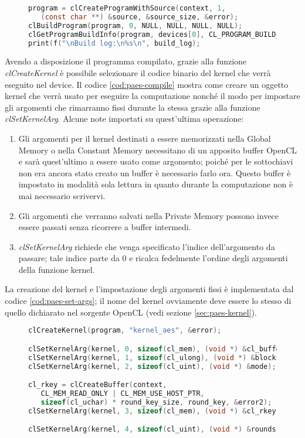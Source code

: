 \documentclass[12pt,a4paper,oneside]{book}
\begin{document}
\begin{figure}
\begin{lstlisting}[caption={\textit{Compilazione del programma da eseguire sul dispositivo.}},label={cod:paes-compile},language=C]
program = clCreateProgramWithSource(context, 1,
   (const char **) &source, &source_size, &error);
clBuildProgram(program, 0, NULL, NULL, NULL, NULL);
clGetProgramBuildInfo(program, devices[0], CL_PROGRAM_BUILD_LOG, 300, build_log, NULL);
print(f("\nBuild log:\n%s\n", build_log);
\end{lstlisting}
\end{figure}

Avendo a disposizione il programma compilato, grazie alla funzione \textit{clCreateKernel} è possibile selezionare il codice binario del kernel che verrà eseguito nel device. Il codice \ref{cod:paes-compile} mostra come creare un oggetto kernel che verrà usato per eseguire la computazione nonché il modo per impostare gli argomenti che rimarranno fissi durante la stessa grazie alla funzione \textit{clSetKernelArg}. Alcune note importati su quest'ultima operazione:
\begin{enumerate}
\item Gli argomenti per il kernel destinati a essere memorizzati nella Global Memory o nella Constant Memory necessitano di un apposito buffer \ac{OpenCL} e sarà quest'ultimo a essere usato come argomento; poiché per le sottochiavi non era ancora stato creato un buffer è necessario farlo ora. Questo buffer è impostato in modalità sola lettura in quanto durante la computazione non è mai necessario scrivervi.
\item Gli argomenti che verranno salvati nella Private Memory possono invece essere passati senza ricorrere a buffer intermedi.
\item \textit{clSetKernelArg} richiede che venga specificato l'indice dell'argomento da passare; tale indice parte da 0 e ricalca fedelmente l'ordine degli argomenti della funzione kernel.
\end{enumerate}
La creazione del kernel e l'impostazione degli argomenti fissi è implementata dal codice \ref{cod:paes-set-args}; il nome del kernel ovviamente deve essere lo stesso di quello dichiarato nel sorgente \ac{OpenCL} (vedi sezione \ref{sec:paes-kernel}).

\begin{figure}
\begin{lstlisting}[caption={\textit{Creazione del kernel e impostazione degli argomenti fissi.}},label={cod:paes-set-args},language=C]
clCreateKernel(program, "kernel_aes", &error);

clSetKernelArg(kernel, 0, sizeof(cl_mem), (void *) &cl_buffer);
clSetKernelArg(kernel, 1, sizeof(cl_ulong), (void *) &blocks);
clSetKernelArg(kernel, 2, sizeof(cl_uint), (void *) &mode);

cl_rkey = clCreateBuffer(context,
   CL_MEM_READ_ONLY | CL_MEM_USE_HOST_PTR,
   sizeof(cl_uchar) * round_key_size, round_key, &error2);
clSetKernelArg(kernel, 3, sizeof(cl_mem), (void *) &cl_rkey);

clSetKernelArg(kernel, 4, sizeof(cl_uint), (void *) &rounds);
\end{lstlisting}
\end{figure}
\end{document}
